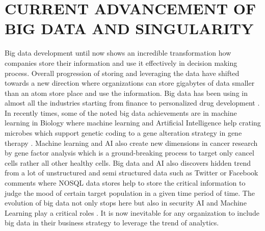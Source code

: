 \documentclass[sigconf]{acmart}
\begin{document}
\section{CURRENT ADVANCEMENT OF BIG DATA AND  SINGULARITY }
Big data development until now shows an incredible transformation how companies store their information and use it effectively in decision making process. Overall progression of storing and leveraging the data have shifted towards a new direction where organizations can store gigabytes of data smaller than an atom store place and use the information. Big data has been using in almost all the industries starting from finance to personalized drug development \cite{editor07}. In recently times, some of the noted big data achievements are in machine learning in Biology where machine learning and Artificial Intelligence help crating microbes which support genetic coding to a gene alteration strategy in gene therapy \cite{editor02}. Machine learning and AI also create new dimensions in cancer research by gene factor analysis which is a ground-breaking process to target only cancel cells rather all other healthy cells. Big data and AI also discovers hidden trend from a lot of unstructured and semi structured data such as Twitter or Facebook comments where NOSQL data stores help to store the critical information to judge the mood of certain target population in a given time period of time. The evolution of big data not only stops here but also in security AI and Machine Learning play a critical roles \cite{editor02}. It is now inevitable for any organization to include big data in their business strategy to leverage the trend of analytics.
\end{document}
